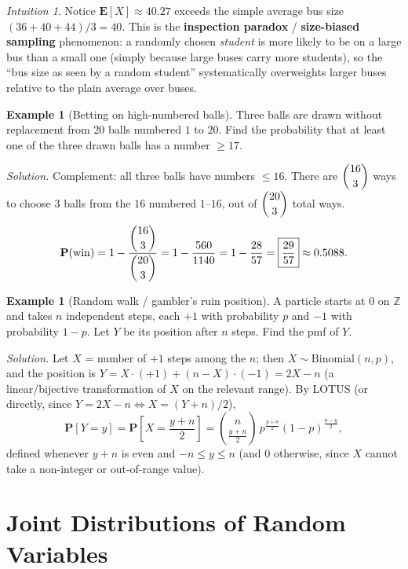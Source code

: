 \documentclass[11pt]{article}
\theoremstyle{definition}
\newtheorem{example}[definition]{Example}
\theoremstyle{plain}
\theoremstyle{remark}
\newtheorem{intuition}[definition]{Intuition}
\newcommand{\E}[1]{\mathbf{E}\!\left[#1\right]}
\newcommand{\Z}{\mathbb{Z}}
\begin{document}
\begin{intuition}
Notice $\E{X}\approx 40.27$ exceeds the simple average bus size $(36+40+44)/3=40$. This is the
\textbf{inspection paradox} / \textbf{size-biased sampling} phenomenon: a randomly chosen
\emph{student} is more likely to be on a large bus than a small one (simply because large buses
carry more students), so the ``bus size as seen by a random student'' systematically overweights
larger buses relative to the plain average over buses.
\end{intuition}

\begin{example}[Betting on high-numbered balls]
Three balls are drawn without replacement from $20$ balls numbered $1$ to $20$. Find the
probability that at least one of the three drawn balls has a number $\ge 17$.

\emph{Solution.} Complement: all three balls have numbers $\le 16$. There are $\dbinom{16}{3}$
ways to choose $3$ balls from the $16$ numbered $1$--$16$, out of $\dbinom{20}{3}$ total ways.
\[
\mathbf{P}(\text{win}) = 1-\frac{\dbinom{16}{3}}{\dbinom{20}{3}} = 1-\frac{560}{1140}
= 1-\frac{28}{57} = \boxed{\frac{29}{57}} \approx 0.5088.
\]
\end{example}

\begin{example}[Random walk / gambler's ruin position]
A particle starts at $0$ on $\Z$ and takes $n$ independent steps, each $+1$ with probability $p$
and $-1$ with probability $1-p$. Let $Y$ be its position after $n$ steps. Find the pmf of $Y$.

\emph{Solution.} Let $X$ = number of $+1$ steps among the $n$; then $X\sim\text{Binomial}(n,p)$,
and the position is $Y = X\cdot(+1) + (n-X)\cdot(-1) = 2X - n$ (a linear/bijective transformation of
$X$ on the relevant range). By LOTUS (or directly, since $Y=2X-n \iff X = (Y+n)/2$),
\[
\mathbf{P}[Y=y] = \mathbf{P}\!\left[X=\frac{y+n}{2}\right]
= \binom{n}{\frac{y+n}{2}}\,p^{\frac{y+n}{2}}(1-p)^{\frac{n-y}{2}},
\]
defined whenever $y+n$ is even and $-n\le y\le n$ (and $0$ otherwise, since $X$ cannot take a
non-integer or out-of-range value).
\end{example}

\newpage
\section{Joint Distributions of Random Variables}
\end{document}
